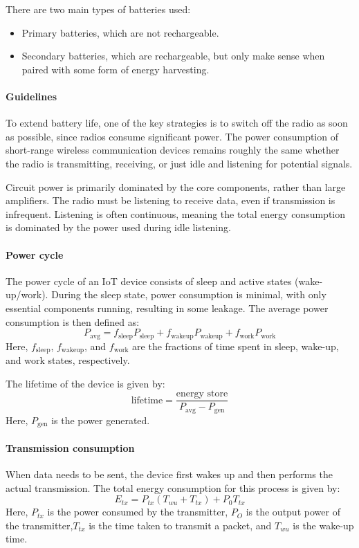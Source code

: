There are two main types of batteries used:
\begin{itemize}
    \item Primary batteries, which are not rechargeable.
    \item Secondary batteries, which are rechargeable, but only make sense when paired with some form of energy harvesting.
\end{itemize}

\paragraph*{Guidelines}
To extend battery life, one of the key strategies is to switch off the radio as soon as possible, since radios consume significant power. 
The power consumption of short-range wireless communication devices remains roughly the same whether the radio is transmitting, receiving, or just idle and listening for potential signals.

Circuit power is primarily dominated by the core components, rather than large amplifiers.
The radio must be listening to receive data, even if transmission is infrequent.
Listening is often continuous, meaning the total energy consumption is dominated by the power used during idle listening.

\paragraph*{Power cycle}
The power cycle of an IoT device consists of sleep and active states (wake-up/work). 
During the sleep state, power consumption is minimal, with only essential components running, resulting in some leakage.
The average power consumption is then defined as:
\[P_{\text{avg}}=f_{\text{sleep}}P_{\text{sleep}}+f_{\text{wakeup}}P_{\text{wakeup}}+f_{\text{work}}P_{\text{work}}\]
Here, $f_{\text{sleep}}$, $f_{\text{wakeup}}$, and $f_{\text{work}}$ are the fractions of time spent in sleep, wake-up, and work states, respectively.

The lifetime of the device is given by:
\[\text{lifetime}=\dfrac{\text{energy store}}{P_{\text{avg}}-P_{\text{gen}}}\]
Here, $P_{\text{gen}}$ is the power generated.

\paragraph*{Transmission consumption}
When data needs to be sent, the device first wakes up and then performs the actual transmission. 
The total energy consumption for this process is given by:
\[E_{tx}=P_{tx}(T_{wu}+T_{tx})+P_{0}T_{tx}\]
Here, $P_{tx}$ is the power consumed by the transmitter, $P_O$ is the output power of the transmitter,$T_{tx}$ is the time taken to transmit a packet, and $T_{wu}$ is the wake-up time.

